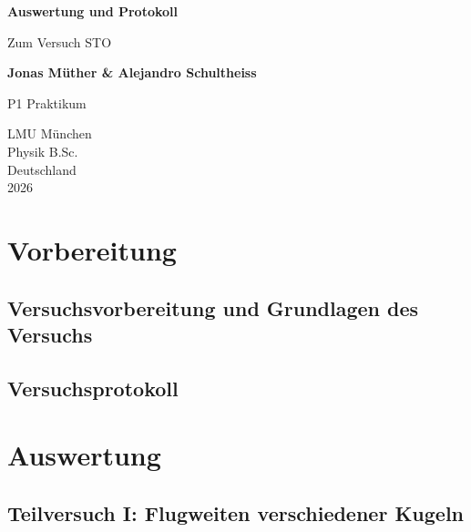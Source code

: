 \documentclass{report}
\begin{document}

\begin{titlepage}
    \begin{center}
        \vspace*{1cm}
            
        \Huge
        \textbf{Auswertung und Protokoll}
            
        \vspace{0.5cm}
        \LARGE
        Zum Versuch STO
        
        \vspace{1.8cm}

        \textbf{Jonas Müther \& Alejandro Schultheiss}
        \vfill
            
        P1 Praktikum\\
       
            
        \vspace{0.8cm}
  

        \vspace{1.8cm}
        \Large
        LMU München \\
        Physik B.Sc.\\
        Deutschland\\
        2026
            
    \end{center}
\end{titlepage}
\tableofcontents

\newpage
\chapter{Vorbereitung}

\section{Versuchsvorbereitung und Grundlagen des Versuchs}


\section{Versuchsprotokoll}


\newpage
\chapter{Auswertung}
\section{Teilversuch I: Flugweiten verschiedener Kugeln}
\end{document}
